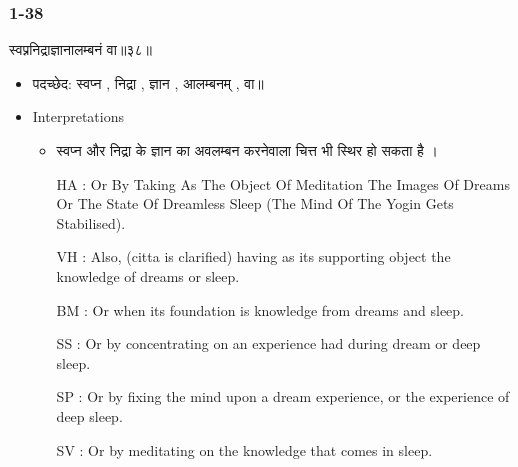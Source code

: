 \begin{frame}[fragile]\frametitle{1-38}
\begin{sanskrit}
स्वप्ननिद्राज्ञानालम्बनं वा॥३८॥
\end{sanskrit}

	\begin{itemize}
	\item पदच्छेद: स्वप्न , निद्रा , ज्ञान , आलम्बनम् , वा॥
	\item Interpretations
		\begin{itemize}	
		\item स्वप्न और निद्रा के ज्ञान का अवलम्बन करनेवाला चित्त भी स्थिर हो सकता है ।
		\item [HA]: Or By Taking As The Object Of Meditation The Images Of Dreams Or The State Of Dreamless Sleep (The Mind Of The Yogin Gets Stabilised).
		\item [VH]: Also, (citta is clarified) having as its supporting object the knowledge of dreams or sleep.
		\item [BM]: Or when its foundation is knowledge from dreams and sleep.
		\item [SS]: Or by concentrating on an experience had during dream or deep sleep.
		\item [SP]: Or by fixing the mind upon a dream experience, or the experience of deep sleep.
		\item [SV]: Or by meditating on the knowledge that comes in sleep. 
		\end{itemize}
	\end{itemize}
	
\end{frame}




